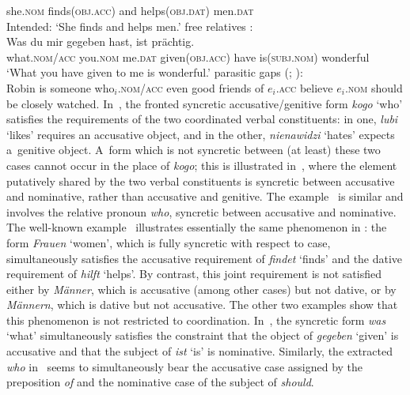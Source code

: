 \documentclass[output=paper,biblatex,babelshorthands,newtxmath,draftmode,colorlinks,citecolor=brown]{langscibook}
\begin{document}
\begin{exe}
\begin{xlist}
\begin{exe}
\begin{xlist}
{      she.\textsc{nom} finds(\textsc{obj.acc}) and helps(\textsc{obj.dat}) men.\textsc{dat}\\
\glt Intended: `She finds and helps men.’
}
\zl
\ea\label{ex:syn:gfr} 
 free relatives \citep[212]{GR81}: \\ [1ex]
\gll Was du mir gegeben hast, ist prächtig. \\
     what.\textsc{nom/acc} you.\textsc{nom} me.\textsc{dat} given(\textsc{obj.acc}) have is(\textsc{subj.nom}) wonderful\\
\glt `What you have given to me is wonderful.’
\z
\ea
\label{ex:syn:epg}
 parasitic gaps (\citealt[482]{HL96a}; \citealt[205]{LHC2001a-u}): \\[1ex]
  Robin is someone who$_i$.\textsc{nom/acc} even good friends of $e_i$.\textsc{acc} believe $e_i$.\textsc{nom} should be closely watched.
\z
In~, the fronted syncretic accusative/genitive form \emph{kogo} `who’ satisfies the requirements of the two coordinated verbal constituents: in one, \emph{lubi} `likes’ requires an accusative object, and in the other, \emph{nienawidzi} `hates’ expects a~genitive object.  A~form which is not syncretic between (at least) these two cases cannot occur in the place of \emph{kogo}; this is illustrated in~, where the element putatively shared by the two verbal constituents is syncretic between accusative and nominative, rather than accusative and genitive.  The  example~ is similar and involves the relative pronoun \emph{who}, syncretic between accusative and nominative.  The well-known example~ illustrates essentially the same phenomenon in : the form \emph{Frauen} `women’, which is fully syncretic with respect to case, simultaneously satisfies the accusative requirement of \emph{findet} `finds’ and the dative requirement of \emph{hilft} `helps’.  By contrast, this joint requirement is not satisfied either by \emph{Männer}, which is accusative (among other cases) but not dative, or by \emph{Männern}, which is dative but not accusative.  The other two examples show that this phenomenon is not restricted to coordination.  In~, the syncretic form \emph{was} `what’ simultaneously satisfies the constraint that the object of \emph{gegeben} `given’ is accusative and that the subject of \emph{ist} `is’ is nominative.  Similarly, the extracted \emph{who} in~ seems to simultaneously bear the accusative case assigned by the preposition \emph{of} and the nominative case of the subject of \emph{should}.


\end{xlist}
\end{exe}
\end{xlist}
\end{exe}
\end{document}
